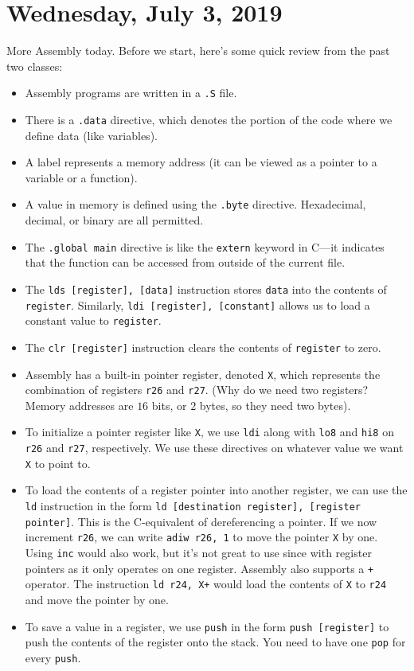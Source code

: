 \section{Wednesday, July 3, 2019}
More Assembly today. Before we start, here's some quick review from the past two classes: \begin{itemize}
    \item Assembly programs are written in a \verb!.S! file.
    \item There is a \verb!.data! directive, which denotes the portion of the code where we define data (like variables).
    \item A label represents a memory address (it can be viewed as a pointer to a variable or a function). 
    \item A value in memory is defined using the \verb!.byte! directive. Hexadecimal, decimal, or binary are all permitted.
    \item The \verb!.global main! directive is like the \verb!extern! keyword in C---it indicates that the function can be accessed from outside of the current file.
    \item The \verb!lds [register], [data]! instruction stores \verb!data! into the contents of \verb!register!. Similarly, \verb!ldi [register], [constant]! allows us to load a constant value to \verb!register!. 
    \item The \verb!clr [register]! instruction clears the contents of \verb!register! to zero. 
    \item Assembly has a built-in pointer register, denoted \verb!X!, which represents the combination of registers \verb!r26! and \verb!r27!. (Why do we need two registers? Memory addresses are $16$ bits, or $2$ bytes, so they need two bytes).
    \item To initialize a pointer register like \verb!X!, we use \verb!ldi! along with \verb!lo8! and \verb!hi8! on \verb!r26! and \verb!r27!, respectively. We use these directives on whatever value we want \verb!X! to point to.
    \item To load the contents of a register pointer into another register, we can use the \verb!ld! instruction in the form \verb!ld [destination register], [register pointer]!. This is the C-equivalent of dereferencing a pointer. If we now increment \verb!r26!, we can write \verb!adiw r26, 1! to move the pointer \verb!X! by one. Using \verb!inc! would also work, but it's not great to use since with register pointers as it only operates on one register. Assembly also supports a \verb!+! operator. The instruction \verb!ld r24, X+! would load the contents of \verb!X! to \verb!r24! and move the pointer by one. 
    \item To save a value in a register, we use \verb!push! in the form \verb!push [register]! to push the contents of the register onto the stack. You need to have one \verb!pop! for every \verb!push!. 
\end{itemize}

